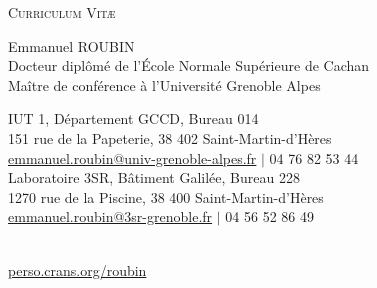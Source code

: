 \documentclass[a4paper,11pt]{article}
\begin{document}
\begin{center} \par\textsc{\huge Curriculum Vit\ae} \end{center}
\begin{minipage}{0.7\linewidth}
  \begin{flushleft}
    \LARGE Emmanuel ROUBIN \normalsize  \vspace{0.1cm} \\
    \large Docteur diplômé de l'École Normale Supérieure de Cachan\\
    \large Maître de conférence à l'Université Grenoble Alpes \normalsize\\\vspace{0.2cm}
    
    IUT 1, Département GCCD, Bureau 014\\
    151 rue de la Papeterie, 38 402 Saint-Martin-d'Hères\\
    \href{mailto:emmanuel.roubin@univ-grenoble-alpes.fr}{emmanuel.roubin@univ-grenoble-alpes.fr} $|$ 04 76 82 53 44 \\
    
    \vspace{0.2cm}  
    Laboratoire 3SR, Bâtiment Galilée, Bureau 228\\
    1270 rue de la Piscine, 38 400 Saint-Martin-d'Hères\\
     \href{mailto:emmanuel.roubin@3sr-grenoble.fr}{emmanuel.roubin@3sr-grenoble.fr} $|$ 04 56 52 86 49\\
    
  \end{flushleft}
\end{minipage}
\hfill
\begin{minipage}{4cm}
  \centering
   \\ \vspace{0.1cm}
  \footnotesize\href{http://perso.crans.org/roubin}{perso.crans.org/roubin}
\end{minipage}
\vspace{0.5cm}
\end{document}
